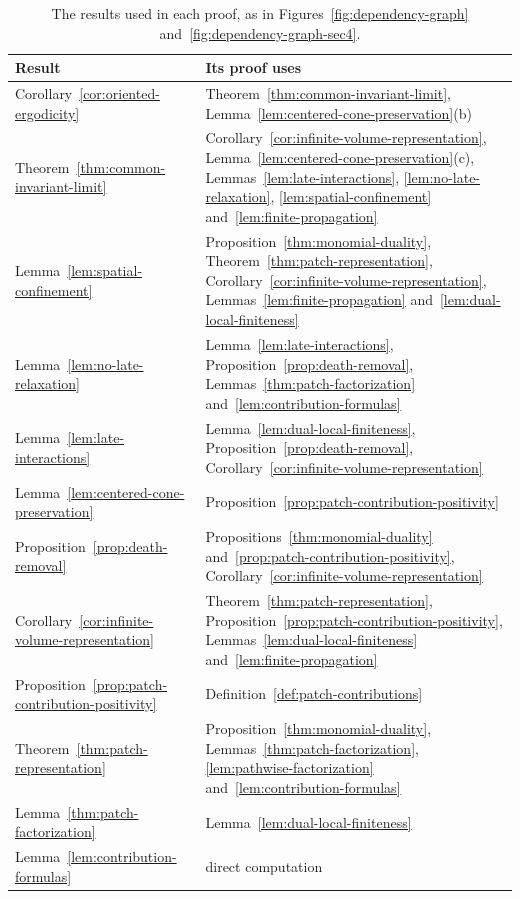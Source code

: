 \documentclass[EJP,preprint,NODS,nobera]{ejpecp}
\begin{document}
\begin{table}[htbp]
\centering
\footnotesize
\begin{tabularx}{\linewidth}{@{}lX@{}}
\hline
Result & Its proof uses \\
\hline
Corollary~\ref{cor:oriented-ergodicity} &
Theorem~\ref{thm:common-invariant-limit},
Lemma~\ref{lem:centered-cone-preservation}\textup{(b)} \\
Theorem~\ref{thm:common-invariant-limit} &
Corollary~\ref{cor:infinite-volume-representation},
Lemma~\ref{lem:centered-cone-preservation}\textup{(c)},
Lemmas~\ref{lem:late-interactions}, \ref{lem:no-late-relaxation},
\ref{lem:spatial-confinement} and~\ref{lem:finite-propagation} \\
Lemma~\ref{lem:spatial-confinement} &
Proposition~\ref{thm:monomial-duality},
Theorem~\ref{thm:patch-representation},
Corollary~\ref{cor:infinite-volume-representation},
Lemmas~\ref{lem:finite-propagation} and~\ref{lem:dual-local-finiteness} \\
Lemma~\ref{lem:no-late-relaxation} &
Lemma~\ref{lem:late-interactions},
Proposition~\ref{prop:death-removal},
Lemmas~\ref{thm:patch-factorization} and~\ref{lem:contribution-formulas} \\
Lemma~\ref{lem:late-interactions} &
Lemma~\ref{lem:dual-local-finiteness},
Proposition~\ref{prop:death-removal},
Corollary~\ref{cor:infinite-volume-representation} \\
Lemma~\ref{lem:centered-cone-preservation} &
Proposition~\ref{prop:patch-contribution-positivity} \\
Proposition~\ref{prop:death-removal} &
Propositions~\ref{thm:monomial-duality} and~\ref{prop:patch-contribution-positivity},
Corollary~\ref{cor:infinite-volume-representation} \\
Corollary~\ref{cor:infinite-volume-representation} &
Theorem~\ref{thm:patch-representation},
Proposition~\ref{prop:patch-contribution-positivity},
Lemmas~\ref{lem:dual-local-finiteness} and~\ref{lem:finite-propagation} \\
Proposition~\ref{prop:patch-contribution-positivity} &
Definition~\ref{def:patch-contributions} \\
Theorem~\ref{thm:patch-representation} &
Proposition~\ref{thm:monomial-duality},
Lemmas~\ref{thm:patch-factorization}, \ref{lem:pathwise-factorization}
and~\ref{lem:contribution-formulas} \\
Lemma~\ref{thm:patch-factorization} &
Lemma~\ref{lem:dual-local-finiteness} \\
Lemma~\ref{lem:contribution-formulas} &
direct computation \\
\hline
\end{tabularx}
\caption{The results used in each proof, as in
Figures~\ref{fig:dependency-graph} and~\ref{fig:dependency-graph-sec4}.}
\label{tab:dependencies}
\end{table}
\end{document}
